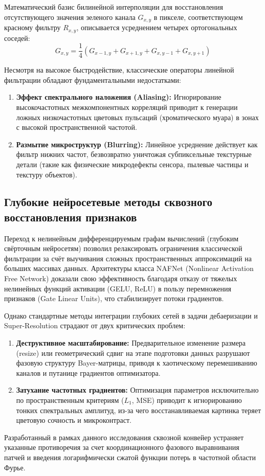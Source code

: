 \documentclass[12pt,a4paper]{article}
\begin{document}
Математический базис билинейной интерполяции для восстановления отсутствующего значения зеленого канала $G_{x,y}$ в пикселе, соответствующем красному фильтру $R_{x,y}$, описывается усреднением четырех ортогональных соседей:
\begin{equation}
G_{x,y} = \frac{1}{4} \left( G_{x-1,y} + G_{x+1,y} + G_{x,y-1} + G_{x,y+1} \right)
\end{equation}

Несмотря на высокое быстродействие, классические операторы линейной фильтрации обладают фундаментальными недостатками:
\begin{enumerate}
    \item \textbf{Эффект спектрального наложения (Aliasing):} Игнорирование высокочастотных межкомпонентных корреляций приводит к генерации ложных низкочастотных цветовых пульсаций (хроматического муара) в зонах с высокой пространственной частотой.
    \item \textbf{Размытие микроструктур (Blurring):} Линейное усреднение действует как фильтр нижних частот, безвозвратно уничтожая субпиксельные текстурные детали (такие как физические микродефекты сенсора, пылевые частицы и текстуру объектов).
\end{enumerate}

\subsection{Глубокие нейросетевые методы сквозного восстановления признаков}

Переход к нелинейным дифференцируемым графам вычислений (глубоким свёрточным нейросетям) позволил релаксировать ограничения классической фильтрации за счёт выучивания сложных пространственных аппроксимаций на больших массивах данных. Архитектуры класса NAFNet (Nonlinear Activation Free Network) доказали свою эффективность благодаря отказу от тяжелых нелинейных функций активации (GELU, ReLU) в пользу перемножения признаков (Gate Linear Units), что стабилизирует потоки градиентов.

Однако стандартные методы интеграции глубоких сетей в задачи дебаеризации и Super-Resolution страдают от двух критических проблем:
\begin{enumerate}
    \item \textbf{Деструктивное масштабирование:} Предварительное изменение размера (resize) или геометрический сдвиг на этапе подготовки данных разрушают фазовую структуру Bayer-матрицы, приводя к хаотическому перемешиванию каналов и путанице градиентов оптимизатора.
    \item \textbf{Затухание частотных градиентов:} Оптимизация параметров исключительно по пространственным критериям ($L_1$, MSE) приводит к игнорированию тонких спектральных амплитуд, из-за чего восстанавливаемая картинка теряет цветовую сочность и микроконтраст.
\end{enumerate}
Разработанный в рамках данного исследования сквозной конвейер устраняет указанные противоречия за счет координационного фазового выравнивания патчей и введения логарифмически сжатой функции потерь в частотной области Фурье.
\end{document}
